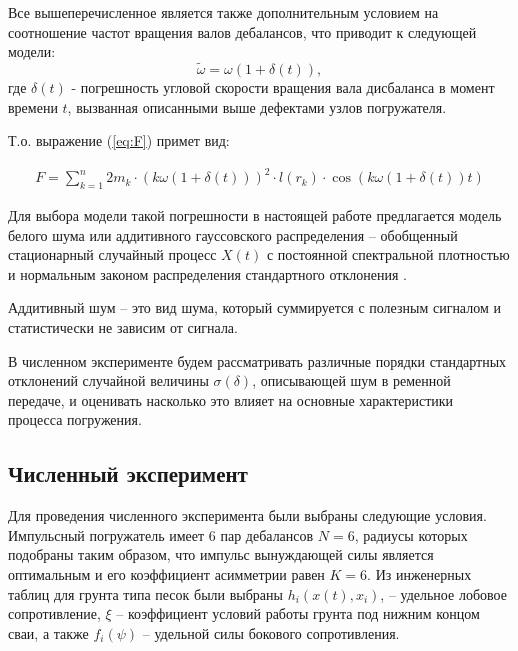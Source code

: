 Все вышеперечисленное является также дополнительным условием на соотношение частот вращения валов дебалансов,
что приводит к следующей модели:
\begin{equation}
    \widetilde{\omega} = \omega (1 + \delta(t)),
\end{equation}
где $\delta(t)$ - погрешность угловой скорости вращения вала дисбаланса в момент времени $t$, вызванная описанными выше дефектами узлов погружателя.

Т.о. выражение (\ref{eq:F}) примет вид:

\begin{equation}
    \label{eq:F_noise}
    \begin{gathered}
        F = \sum\limits_{k = 1}^n 2 m_k \cdot (k \omega (1 + \delta(t)))^2 \cdot l(r_k) \cdot \cos (k \omega (1 + \delta(t)) t)
    \end{gathered}
\end{equation}

Для выбора модели такой погрешности в настоящей работе предлагается модель белого шума или аддитивного
гауссовского распределения -- обобщенный стационарный случайный процесс $X(t)$ с постоянной спектральной
плотностью и нормальным законом распределения стандартного отклонения \cite{yakovleva}.

\begin{definition}
    Аддитивный шум -- это вид шума, который суммируется с полезным сигналом и статистически не зависим
    от сигнала.
\end{definition}

В численном эксперименте будем рассматривать различные порядки стандартных отклонений случайной
величины $\sigma(\delta)$, описывающей шум в ременной передаче, и оценивать насколько это влияет на
основные характеристики процесса погружения.

\subsection{Численный эксперимент}

Для проведения численного эксперимента были выбраны следующие условия. Импульсный погружатель имеет 6 пар дебалансов $N=6$,
радиусы которых подобраны таким образом, что импульс вынуждающей силы является оптимальным и его коэффициент асимметрии равен $K=6$.
Из инженерных таблиц для грунта типа песок были выбраны $h_i(x(t),x_i)$, – удельное лобовое сопротивление, $\xi$ – коэффициент
условий работы грунта под нижним концом сваи, а также $f_i(\psi)$ – удельной силы бокового сопротивления.

